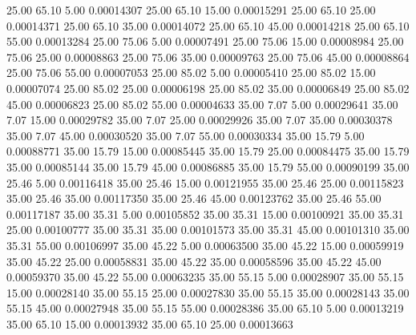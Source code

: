      25.00     65.10      5.00     0.00014307
     25.00     65.10     15.00     0.00015291
     25.00     65.10     25.00     0.00014371
     25.00     65.10     35.00     0.00014072
     25.00     65.10     45.00     0.00014218
     25.00     65.10     55.00     0.00013284
     25.00     75.06      5.00     0.00007491
     25.00     75.06     15.00     0.00008984
     25.00     75.06     25.00     0.00008863
     25.00     75.06     35.00     0.00009763
     25.00     75.06     45.00     0.00008864
     25.00     75.06     55.00     0.00007053
     25.00     85.02      5.00     0.00005410
     25.00     85.02     15.00     0.00007074
     25.00     85.02     25.00     0.00006198
     25.00     85.02     35.00     0.00006849
     25.00     85.02     45.00     0.00006823
     25.00     85.02     55.00     0.00004633
     35.00      7.07      5.00     0.00029641
     35.00      7.07     15.00     0.00029782
     35.00      7.07     25.00     0.00029926
     35.00      7.07     35.00     0.00030378
     35.00      7.07     45.00     0.00030520
     35.00      7.07     55.00     0.00030334
     35.00     15.79      5.00     0.00088771
     35.00     15.79     15.00     0.00085445
     35.00     15.79     25.00     0.00084475
     35.00     15.79     35.00     0.00085144
     35.00     15.79     45.00     0.00086885
     35.00     15.79     55.00     0.00090199
     35.00     25.46      5.00     0.00116418
     35.00     25.46     15.00     0.00121955
     35.00     25.46     25.00     0.00115823
     35.00     25.46     35.00     0.00117350
     35.00     25.46     45.00     0.00123762
     35.00     25.46     55.00     0.00117187
     35.00     35.31      5.00     0.00105852
     35.00     35.31     15.00     0.00100921
     35.00     35.31     25.00     0.00100777
     35.00     35.31     35.00     0.00101573
     35.00     35.31     45.00     0.00101310
     35.00     35.31     55.00     0.00106997
     35.00     45.22      5.00     0.00063500
     35.00     45.22     15.00     0.00059919
     35.00     45.22     25.00     0.00058831
     35.00     45.22     35.00     0.00058596
     35.00     45.22     45.00     0.00059370
     35.00     45.22     55.00     0.00063235
     35.00     55.15      5.00     0.00028907
     35.00     55.15     15.00     0.00028140
     35.00     55.15     25.00     0.00027830
     35.00     55.15     35.00     0.00028143
     35.00     55.15     45.00     0.00027948
     35.00     55.15     55.00     0.00028386
     35.00     65.10      5.00     0.00013219
     35.00     65.10     15.00     0.00013932
     35.00     65.10     25.00     0.00013663
